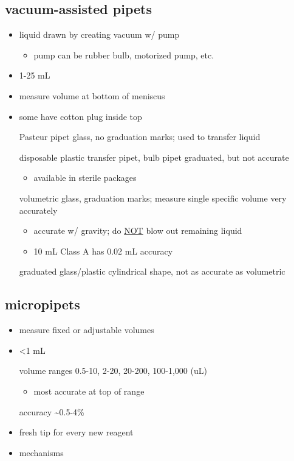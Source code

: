 \documentclass[11pt]{article}
\begin{document}
\subsection{vacuum-assisted pipets}
\label{sec:orga283daa}
\begin{itemize}
\item liquid drawn by creating vacuum w/ pump
\begin{itemize}
\item pump can be rubber bulb, motorized pump, etc.
\end{itemize}
\item 1-25 mL
\item measure volume at bottom of meniscus
\item some have cotton plug inside top
\item[{Pasteur pipet}] glass, no graduation marks; used to transfer liquid
\item[{disposable plastic transfer pipet, bulb pipet}] graduated, but not accurate
\begin{itemize}
\item available in sterile packages
\end{itemize}
\item[{volumetric}] glass, graduation marks; measure single specific volume very accurately
\begin{itemize}
\item accurate w/ gravity; do \uline{NOT} blow out remaining liquid
\item 10 mL Class A has 0.02 mL accuracy
\end{itemize}
\item[{graduated}] glass/plastic cylindrical shape, not as accurate as volumetric
\end{itemize}
\subsection{micropipets}
\label{sec:org09aec1f}
\begin{itemize}
\item measure fixed or adjustable volumes
\item <1 mL
\item[{volume ranges}] 0.5-10, 2-20, 20-200, 100-1,000 (uL)
\begin{itemize}
\item most accurate at top of range
\end{itemize}
\item[{accuracy}] \textasciitilde{}0.5-4\%
\item fresh tip for every new reagent
\item mechanisms
\end{itemize}
\end{document}
